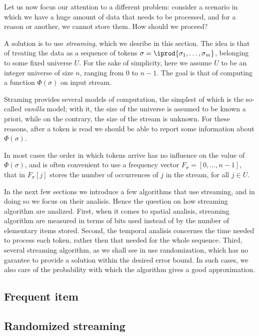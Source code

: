 \documentclass{subfiles}
\begin{document}
    Let us now focus our attention to a different problem:
        consider a scenario in which we have a huge amount of data that needs to be processed,
        and for a reason or another, we cannot store them. How should we proceed?

    A solution is to use \emph{streaming}, which we desribe in this section.
        The idea is that of treating the data as a sequence of tokens
        \(\sigma = \iprod{\sigma_{1}, \ldots, \sigma_{m}}\), belonging to some fixed universe \(U\).
        For the sake of simplicity, here we assume \(U\) to be an integer universe of size \(n\),
        ranging from \(0\) to \(n - 1\).
        The goal is that of computing a function \(\Phi(\sigma)\) on input stream.

    Straming provides several models of computation,
        the simplest of which is the so-called \emph{vanilla} model;
        with it, the size of the universe is assumed to be known a priori,
        while on the contrary, the size of the stream is unknown. For these reasons,
        after a token is read we should be able to report some information about \(\Phi(\sigma)\).

    In most cases the order in which tokens arrive has no influence on the value of \(\Phi(\sigma)\),
        and is often convenient to use a frequency vector \(F_{\sigma} = [0, \ldots, n - 1]\),
        that in \(F_{\sigma}[j]\) stores the number of occurrences of \(j\) in the stream,
        for all \(j \in U\).

    In the next few sections we introduce a few algorithms that use streaming,
        and in doing so we focus on their analisis.
        Hence the question on how streaming algorithm are analized.
        First, when it comes to spatial analisis,
        streaming algorithm are measured in terms of bits used instead of by the number of elementary 
        items stored. Second, the temporal analisis concernes the time needed to process each token,
        rather then that needed for the whole sequence. Third, several streaming algorithm,
        as we shall see in  use randomization,
        which has no garantee to provide a solution within the desired error bound.
        In such cases, we also care of the probability with which the algorithm gives a good approximation.

    \subsection{Frequent item}
    

    \subsection{Randomized streaming}
    
\end{document}
